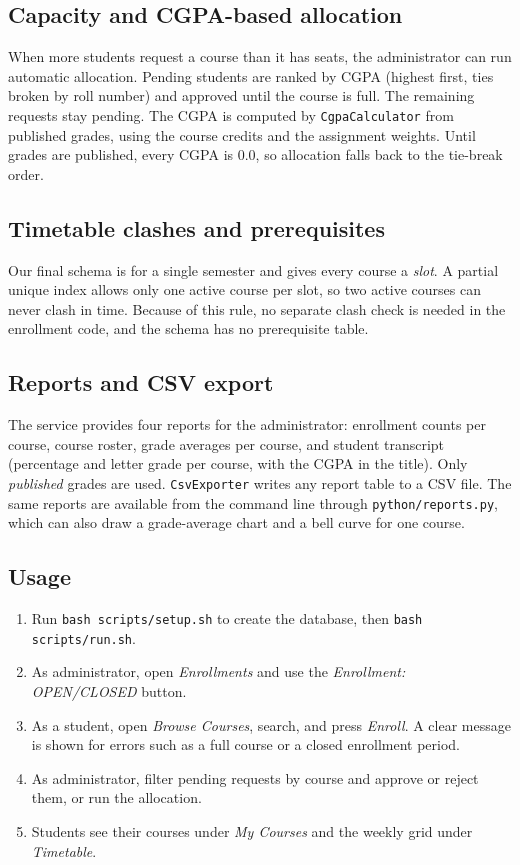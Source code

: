 \subsection{Capacity and CGPA-based allocation}
When more students request a course than it has seats, the administrator can run automatic allocation.
Pending students are ranked by CGPA (highest first, ties broken by roll number) and approved until the
course is full. The remaining requests stay pending. The CGPA is computed by \texttt{CgpaCalculator} from
published grades, using the course credits and the assignment weights. Until grades are published, every
CGPA is $0.0$, so allocation falls back to the tie-break order.

\subsection{Timetable clashes and prerequisites}
Our final schema is for a single semester and gives every course a \emph{slot}. A partial unique index
allows only one active course per slot, so two active courses can never clash in time. Because of this
rule, no separate clash check is needed in the enrollment code, and the schema has no prerequisite table.

\subsection{Reports and CSV export}
The service provides four reports for the administrator: enrollment counts per course, course roster,
grade averages per course, and student transcript (percentage and letter grade per course, with the CGPA
in the title). Only \emph{published} grades are used. \texttt{CsvExporter} writes any report table to a CSV
file. The same reports are available from the command line through \texttt{python/reports.py}, which can
also draw a grade-average chart and a bell curve for one course.

\subsection{Usage}
\begin{enumerate}
  \item Run \texttt{bash scripts/setup.sh} to create the database, then \texttt{bash scripts/run.sh}.
  \item As administrator, open \emph{Enrollments} and use the \emph{Enrollment: OPEN/CLOSED} button.
  \item As a student, open \emph{Browse Courses}, search, and press \emph{Enroll}. A clear message is shown
        for errors such as a full course or a closed enrollment period.
  \item As administrator, filter pending requests by course and approve or reject them, or run the allocation.
  \item Students see their courses under \emph{My Courses} and the weekly grid under \emph{Timetable}.
\end{enumerate}

